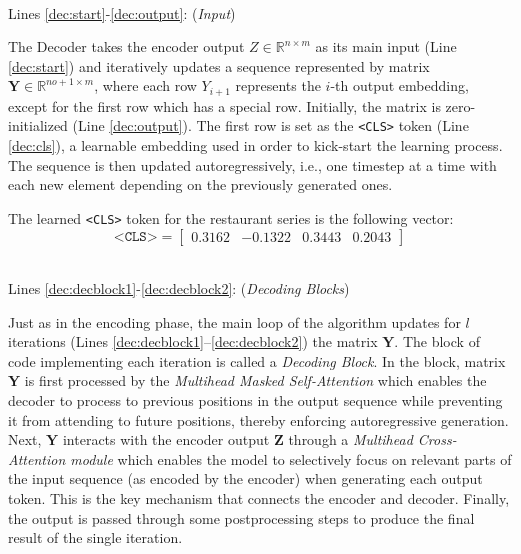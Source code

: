 \documentclass[algorithms,article,submit,pdftex,moreauthors]{Definitions/mdpi}
\begin{document}
~\\Lines \ref{dec:start}-\ref{dec:output}: (\textit{Input})

The Decoder takes the encoder output $Z \in \mathbb{R}^{n \times m}$ as its main input (Line \ref{dec:start}) and iteratively updates a sequence represented by matrix $\textbf{Y} \in \mathbb{R}^{no + 1 \times m}$, where each row $Y_{i+1}$ represents the $i$-th output embedding, except for the first row which has a special row. Initially, the matrix is zero-initialized (Line \ref{dec:output}). The first row is set as the \texttt{<CLS>} token (Line \ref{dec:cls}), a learnable embedding used in order to kick-start the learning process. The sequence is then updated autoregressively, i.e., one timestep at a time with each new element depending on the previously generated ones.

The learned \texttt{<CLS>} token for the restaurant series is the following vector:
$$
	\texttt{<CLS>} = 	\begin{bmatrix}
		0.3162 & -0.1322 & 0.3443 & 0.2043
						\end{bmatrix}
$$

~\\Lines \ref{dec:decblock1}-\ref{dec:decblock2}: (\textit{Decoding Blocks})

Just as in the encoding phase, the main loop of the algorithm updates for $l$ iterations (Lines \ref{dec:decblock1}–\ref{dec:decblock2}) the matrix $\textbf{Y}$. The block of code implementing each iteration is called a \textit{Decoding Block}.
In the block, matrix {\bf Y} is first processed by the {\em Multihead Masked Self-Attention} which enables the decoder to process to previous positions in the output sequence while preventing it from attending to future positions, thereby enforcing autoregressive generation.
Next, $\mathbf{Y}$ interacts with the encoder output $\mathbf{Z}$ through a {\em Multihead Cross-Attention module} which enables the model to selectively focus on relevant parts of the input sequence (as encoded by the encoder) when generating each output token. This is the key mechanism that connects the encoder and decoder.
Finally, the output is passed through some postprocessing steps to produce the final result of the single iteration.

\end{document}
